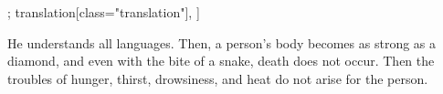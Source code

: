 \begin{alignment}[
  texts=edition[class="edition"];
  translation[class="translation"],
  ]
\begin{translation}
\begin{tlate}[p42_01]
He understands all languages. Then, a person's body becomes as strong as a diamond, and even with the bite of a snake, death does not occur. Then the troubles of hunger, thirst, drowsiness, and heat do not arise for the person.
\flushpage 
    \end{tlate}
  \end{translation}
\end{alignment}
\pagebreak %

